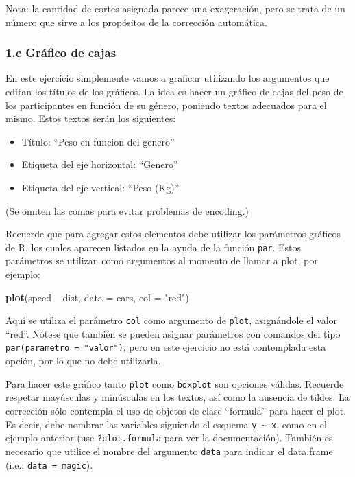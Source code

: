\documentclass[]{article}
\newenvironment{Shaded}{}{}
\newcommand{\KeywordTok}[1]{\textcolor[rgb]{0.00,0.44,0.13}{\textbf{{#1}}}}
\newcommand{\DataTypeTok}[1]{\textcolor[rgb]{0.56,0.13,0.00}{{#1}}}
\newcommand{\StringTok}[1]{\textcolor[rgb]{0.25,0.44,0.63}{{#1}}}
\newcommand{\NormalTok}[1]{{#1}}
\begin{document}
Nota: la cantidad de cortes asignada parece una exageración, pero se
trata de un número que sirve a los propósitos de la corrección
automática.

\subsubsection{1.c Gráfico de cajas}

En este ejercicio simplemente vamos a graficar utilizando los argumentos
que editan los títulos de los gráficos. La idea es hacer un gráfico de
cajas del peso de los participantes en función de su género, poniendo
textos adecuados para el mismo. Estos textos serán los siguientes:

\begin{itemize}
\item
  Título: ``Peso en funcion del genero''
\item
  Etiqueta del eje horizontal: ``Genero''
\item
  Etiqueta del eje vertical: ``Peso (Kg)''
\end{itemize}

(Se omiten las comas para evitar problemas de encoding.)

Recuerde que para agregar estos elementos debe utilizar los parámetros
gráficos de R, los cuales aparecen listados en la ayuda de la función
\texttt{par}. Estos parámetros se utilizan como argumentos al momento de
llamar a plot, por ejemplo:

\begin{Shaded}
\begin{Highlighting}[]
\KeywordTok{plot}\NormalTok{(speed ~}\StringTok{ }\NormalTok{dist, }\DataTypeTok{data =} \NormalTok{cars, }\DataTypeTok{col =} \StringTok{"red"}\NormalTok{)}
\end{Highlighting}
\end{Shaded}

Aquí se utiliza el parámetro \texttt{col} como argumento de
\texttt{plot}, asignándole el valor ``red''. Nótese que también se
pueden asignar parámetros con comandos del tipo
\texttt{par(parametro = "valor")}, pero en este ejercicio no está
contemplada esta opción, por lo que no debe utilizarla.

Para hacer este gráfico tanto \texttt{plot} como \texttt{boxplot} son
opciones válidas. Recuerde respetar mayúsculas y minúsculas en los
textos, así como la ausencia de tildes. La corrección sólo contempla el
uso de objetos de clase ``formula'' para hacer el plot. Es decir, debe
nombrar las variables siguiendo el esquema
\texttt{y \textasciitilde{} x}, como en el ejemplo anterior (use
\texttt{?plot.formula} para ver la documentación). También es necesario
que utilice el nombre del argumento \texttt{data} para indicar el
data.frame (i.e.: \texttt{data = magic}).
\end{document}
